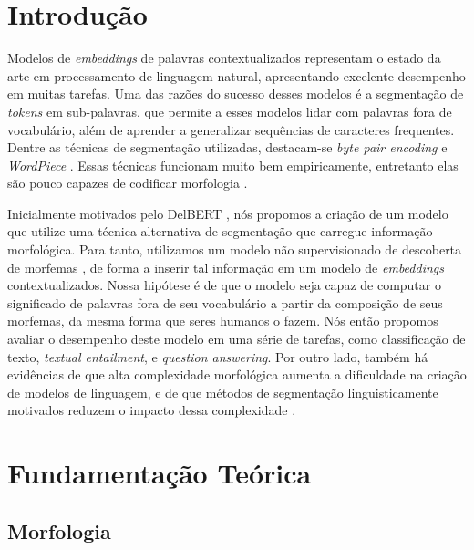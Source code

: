 \documentclass[cic,tc]{iiufrgs}
\begin{document}
\tableofcontents


\chapter{Introdução}
Modelos de \emph{embeddings} de palavras contextualizados \cite{peters-etal-2018-deep} representam o estado da arte em processamento de linguagem natural, apresentando excelente desempenho em muitas tarefas. Uma das razões do sucesso desses modelos é a segmentação de \emph{tokens} em sub-palavras, que permite a esses modelos lidar com palavras fora de vocabulário, além de aprender a generalizar sequências de caracteres frequentes. Dentre as técnicas de segmentação utilizadas, destacam-se \emph{byte pair encoding} \cite{sennrich-etal-2016-neural} e \emph{WordPiece} \cite{Wu2016GooglesNM}. Essas técnicas funcionam muito bem empiricamente, entretanto elas são pouco capazes de codificar morfologia \cite{klein-tsarfaty-2020-getting}.

Inicialmente motivados pelo DelBERT \cite{Hofmann2021SuperbizarreIN}, nós propomos a criação de um modelo que utilize uma técnica alternativa de segmentação que carregue informação morfológica. Para tanto, utilizamos um modelo não supervisionado de descoberta de morfemas \cite{creutz-lagus-2002-unsupervised}, de forma a inserir tal informação em um modelo de \emph{embeddings} contextualizados. Nossa hipótese é de que o modelo seja capaz de computar o significado de palavras fora de seu vocabulário a partir da composição de seus morfemas, da mesma forma que seres humanos o fazem. Nós então propomos avaliar o desempenho deste modelo em uma série de tarefas, como classificação de texto, \emph{textual entailment}, e \emph{question answering}. Por outro lado, também há evidências de que alta complexidade morfológica aumenta a dificuldade na criação de modelos de linguagem, e de que métodos de segmentação linguisticamente motivados reduzem o impacto dessa complexidade \cite{morphology-matters-tacl-2021}.

\chapter{Fundamentação Teórica}
\section{Morfologia}
\end{document}
